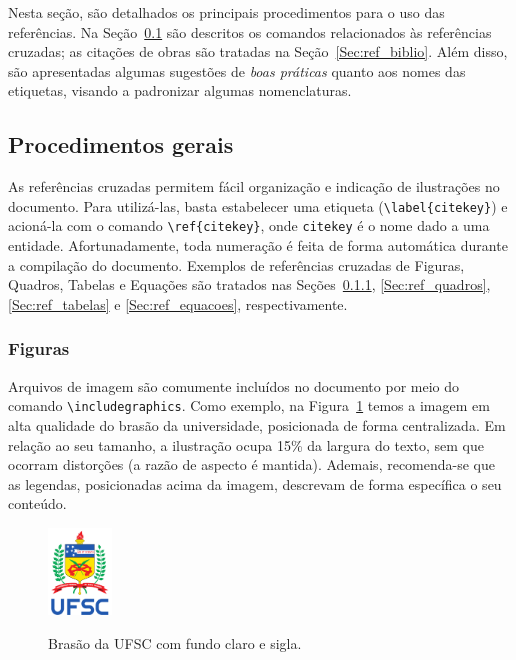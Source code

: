 \documentclass[
	12pt,				%
	oneside,			%
	a4paper,			%
	chapter=TITLE,		%
	section=TITLE,		%
	english,			%
	brazil,				%
	]{abntex2}
\begin{document}
\begin{apendicesenv}
    Nesta seção, são detalhados os principais procedimentos para o uso das referências.
    Na Seção~\ref{Sec:ref_cruzadas} são descritos os comandos relacionados às referências cruzadas; as citações de obras são tratadas na Seção~\ref{Sec:ref_biblio}.
    Além disso, são apresentadas algumas sugestões de \emph{boas práticas} quanto aos nomes das etiquetas, visando a padronizar algumas nomenclaturas.

    \subsection{Procedimentos gerais}
    \label{Sec:ref_cruzadas}

    As referências cruzadas permitem fácil organização e indicação de ilustrações no documento.
    Para utilizá-las, basta estabelecer uma etiqueta (\verb|\label{citekey}|) e acioná-la com o comando \verb|\ref{citekey}|, onde \verb|citekey| é o nome dado a uma entidade.
    Afortunadamente, toda numeração é feita de forma automática durante a compilação do documento.
    Exemplos de referências cruzadas de Figuras, Quadros, Tabelas e Equações são tratados nas Seções~\ref{Sec:ref_figuras}, \ref{Sec:ref_quadros}, \ref{Sec:ref_tabelas} e \ref{Sec:ref_equacoes}, respectivamente.

    \subsubsection{Figuras}
    \label{Sec:ref_figuras}

    Arquivos de imagem são comumente incluídos no documento por meio do comando \verb|\includegraphics|.
    Como exemplo, na Figura~\ref{Fig:brasao_ufsc} temos a imagem em alta qualidade do brasão da universidade, posicionada de forma centralizada.
    Em relação ao seu tamanho, a ilustração ocupa 15\% da largura do texto, sem que ocorram distorções (a razão de aspecto é mantida).
    Ademais, recomenda-se que as legendas, posicionadas acima da imagem, descrevam de forma específica o seu conteúdo.

    \begin{figure}[htb]
        \centering
        \caption{Brasão da UFSC com fundo claro e sigla.}
        \includegraphics[width=0.15\textwidth]{vertical_sigla_fundo_claro.pdf}
        \label{Fig:brasao_ufsc}
    \end{figure}


\end{apendicesenv}
\end{document}
